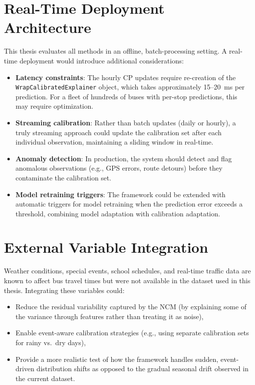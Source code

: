 \section{Real-Time Deployment Architecture}
\label{sec:fw_deployment}

This thesis evaluates all methods in an offline, batch-processing setting. A real-time deployment would introduce additional considerations:

\begin{itemize}
    \item \textbf{Latency constraints}: The hourly CP updates require re-creation of the \texttt{WrapCalibratedExplainer} object, which takes approximately 15--20~ms per prediction. For a fleet of hundreds of buses with per-stop predictions, this may require optimization.
    \item \textbf{Streaming calibration}: Rather than batch updates (daily or hourly), a truly streaming approach could update the calibration set after each individual observation, maintaining a sliding window in real-time.
    \item \textbf{Anomaly detection}: In production, the system should detect and flag anomalous observations (e.g., GPS errors, route detours) before they contaminate the calibration set.
    \item \textbf{Model retraining triggers}: The framework could be extended with automatic triggers for model retraining when the prediction error exceeds a threshold, combining model adaptation with calibration adaptation.
\end{itemize}


\section{External Variable Integration}
\label{sec:fw_external}

Weather conditions, special events, school schedules, and real-time traffic data are known to affect bus travel times but were not available in the dataset used in this thesis. Integrating these variables could:

\begin{itemize}
    \item Reduce the residual variability captured by the NCM (by explaining some of the variance through features rather than treating it as noise),
    \item Enable event-aware calibration strategies (e.g., using separate calibration sets for rainy vs.\ dry days),
    \item Provide a more realistic test of how the framework handles sudden, event-driven distribution shifts as opposed to the gradual seasonal drift observed in the current dataset.
\end{itemize}


